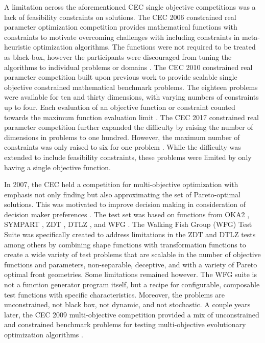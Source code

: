 \documentclass[a4paper]{article}
\begin{document}
A limitation across the aforementioned CEC single objective competitions was a lack of feasibility constraints on solutions. The CEC 2006 constrained real parameter optimization competition provides mathematical functions with constraints to motivate overcoming challenges with including constraints in meta-heuristic optimization algorithms. The functions were not required to be treated as black-box, however the participants were discouraged from tuning the algorithms to individual problems or domains \cite{liang_problem_2006}. The CEC 2010 constrained real parameter competition built upon previous work to provide scalable single objective constrained mathematical benchmark problems. The eighteen problems were available for ten and thirty dimensions, with varying numbers of constraints up to four. Each evaluation of an objective function or constraint counted towards the maximum function evaluation limit \cite{mallipeddi_problem_2010}. The CEC 2017 constrained real parameter competition further expanded the difficulty by raising the number of dimensions in problems to one hundred. However, the maximum number of constraints was only raised to six for one problem \cite{wu_problem_2016}. While the difficulty was extended to include feasibility constraints, these problems were limited by only having a single objective function.



In 2007, the CEC held a competition for multi-objective optimization with emphasis not only finding but also approximating the set of Pareto-optimal solutions. This was motivated to improve decision making in consideration of decision maker preferences \cite{huang_problem_2007}. The test set was based on functions from OKA2 \cite{hutchison_test_2004}, SYMPART \cite{obayashi_capabilities_2007}, ZDT \cite{zitzler_comparison_2000}, DTLZ \cite{deb_scalable_2002}, and WFG \cite{huband_scalable_2005}. The Walking Fish Group (WFG) Test Suite \cite{huband_scalable_2005} was specifically created to address limitations in the ZDT and DTLZ tests among others by combining shape functions with transformation functions to create a wide variety of test problems that are scalable in the number of objective functions and parameters, non-separable, deceptive, and with a variety of Pareto optimal front geometries. Some limitations remained however. The WFG suite is not a function generator program itself, but a recipe for configurable, composable test functions with specific characteristics. Moreover, the problems are unconstrained, not black box, not dynamic, and not stochastic. A couple years later, the CEC 2009 multi-objective competition provided a mix of unconstrained and constrained benchmark problems for testing multi-objective evolutionary optimization algorithms \cite{zhang_multiobjective_2009}.
\end{document}
